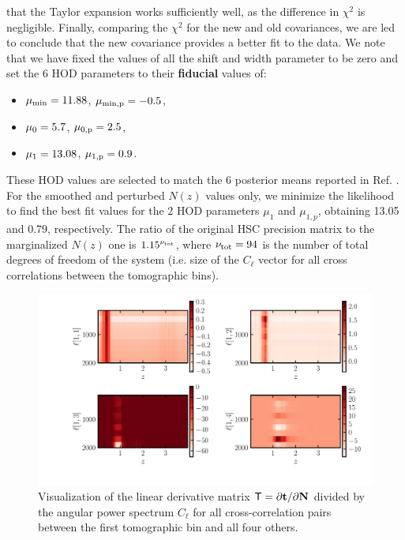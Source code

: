\documentclass[a4paper,11pt]{article}
\newcommand{\vt}{\mathbf{t}}
\newcommand{\vN}{\mathbf{N}}
\begin{document}
that the Taylor expansion works sufficiently well,
as the difference in $\chi^2$ is negligible. Finally,
comparing the $\chi^2$ for the new
and old covariances, we are led to conclude that the
new covariance provides a better fit to the data.
We note that we have fixed the values of
all the shift and width parameter to be zero and set the
6 HOD parameters to their \textbf{fiducial}
values of:
\begin{itemize}
    \item $\mu_{\rm min} = 11.88$, $\mu_{\rm min,p} = -0.5$,
    \item $\mu_{\rm 0} = 5.7$, $\mu_{\rm 0,p} = 2.5$,
    \item $\mu_{\rm 1} = 13.08$, $\mu_{\rm 1,p} = 0.9$.
\end{itemize}
These HOD values
are selected to match the 6 posterior means reported in Ref.
\cite{1912.08209}. For the smoothed and perturbed
$N(z)$ values only, we minimize the likelihood to find the best
fit values for the 2 HOD parameters $\mu_1$ and $\mu_{1,p}$,
obtaining 13.05 and 0.79, respectively. The ratio of 
the original HSC precision matrix to the marginalized $N(z)$ 
one is  $1.15^{\nu_{\rm tot}}$, where $\nu_{\rm tot} = 94$ is the number of total
degrees of freedom of the system (i.e. size of the $C_\ell$
vector for all cross correlations between the tomographic bins).


\begin{figure}[ht]
\centering  
\includegraphics[width=1.\textwidth]{./Tmat}
\caption{Visualization of the linear derivative matrix ${\sf T}
= {\partial \vt}/{\partial \vN}$ divided by the angular power
spectrum $C_{\ell}$ for all cross-correlation pairs between
the first tomographic bin and all four others.} 
\label{fig:Tmat}
\end{figure}
\end{document}
